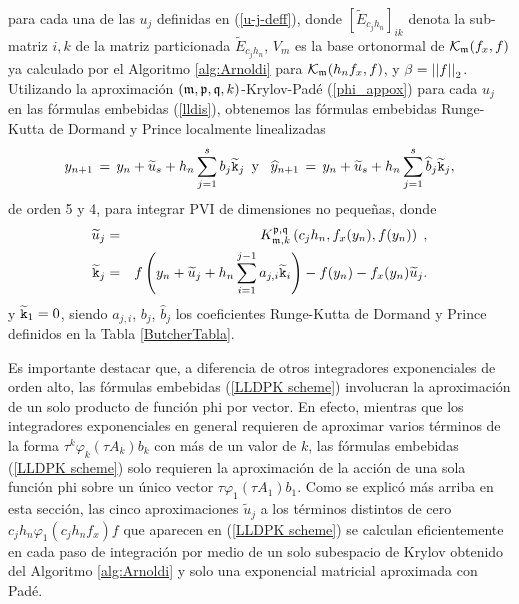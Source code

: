 para cada una de las $u_j$ definidas en (\ref{u-j-deff}),
donde $[\widetilde{E}_{c_jh_n}]_{ik}$ denota la sub-matriz $i,k$ de la matriz particionada $\widetilde{E}_{c_jh_n}$, $V_m$ es la base ortonormal de $\mathcal{K}_ {\mathfrak{m}}(f_x,f)$ ya calculado por el Algoritmo \ref{alg:Arnoldi} para $\mathcal{K}_{\mathfrak{m}}(h_nf_x,f)$, y $\beta=\left\lvert \left\lvert f \right\rvert  \right\rvert_2$.
Utilizando la aproximación $(\mathfrak{m} , \mathfrak{p} ,\mathfrak{q} , k)$-Krylov-Padé (\ref{phi_appox}) para cada $u_j$ en las fórmulas embebidas (\ref{lldis}), obtenemos las fórmulas embebidas Runge-Kutta de Dormand y Prince localmente linealizadas
\begin{equation}  \label{LLDPK scheme}
    y_{n+1}\,=\,y_n+\widetilde{u}_s+h_n \sum_{j=1}^{s}b_j \widetilde{\mathtt{k}}_j \,\,\, \text{y} \,\,\, \
    \widehat{y}_{n+1}\,=\, y_n+\widetilde{u}_s+h_n \sum_{j=1}^{s}\widehat{b}_j \widetilde{\mathtt{k}}_j,
\end{equation}
de orden 5 y 4, para integrar PVI de dimensiones no pequeñas, donde
\begin{eqnarray}
	\widetilde{u}_j & = &K_{\mathfrak{m},k}^{\mathfrak{p},\mathfrak{q}}\left( c_jh_n, f_x(y_n) , f(y_n) \right) \;, \label{llrk-uj} \\
    \widetilde{\mathtt{k}}_j & = & f\left( y_n+\widetilde{u}_j+h_n \sum_{i=1}^{j-1}a_{j,i}\widetilde{\mathtt{k}}_i \right) - f( y_n) - f_x(y_n)\widetilde{u}_j. \nonumber
\end{eqnarray}
y $\widetilde{\mathtt{k}}_1=0$, siendo $a_{j,i}$, $b_j$, $\widehat{b}_j$ los coeficientes Runge-Kutta de  Dormand y Prince definidos en la Tabla \ref{ButcherTabla}.

Es importante destacar que, a diferencia de otros integradores exponenciales de orden alto, las fórmulas embebidas (\ref{LLDPK scheme}) involucran la aproximación de un solo producto de función phi por vector. En efecto, mientras que los integradores exponenciales en general requieren de aproximar varios términos de la forma $\tau^k \varphi_k(\tau A_k)b_k$ con más de un valor de $k$, las fórmulas embebidas (\ref{LLDPK scheme}) solo requieren la aproximación de la acción de una sola función phi sobre un único vector $\tau \varphi_1(\tau A_1)b_1$. Como se explicó más arriba en esta sección, las cinco aproximaciones $\widetilde{u}_j$ a los términos distintos de cero $c_jh_n\varphi_1(c_jh_nf_x)f$ que aparecen en (\ref{LLDPK scheme}) se calculan eficientemente en cada paso de integración por medio de un solo subespacio de Krylov obtenido del Algoritmo \ref{alg:Arnoldi} y solo una exponencial matricial aproximada con Padé.

